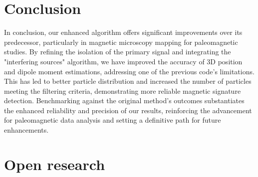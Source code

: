 \section{Conclusion}

In conclusion, our enhanced algorithm offers significant improvements over its predecessor, particularly in magnetic microscopy mapping for paleomagnetic studies. By refining the isolation of the primary signal and integrating the "interfering sources" algorithm, we have improved the accuracy of 3D position and dipole moment estimations, addressing one of the previous code's limitations. This has led to better particle distribution and increased the number of particles meeting the filtering criteria, demonstrating more reliable magnetic signature detection. Benchmarking against the original method's outcomes substantiates the enhanced reliability and precision of our results, reinforcing the advancement for paleomagnetic data analysis and setting a definitive path for future enhancements.


\section{Open research}





